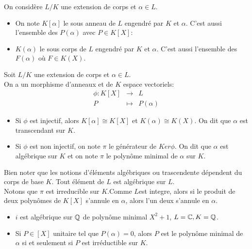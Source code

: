 \begin{definition}
	On considère $L/K$ une extension de corps et $\alpha \in L$. \\
	\begin{itemize}
		\item On note $K[\alpha]$ le sous anneau de $L$ engendré par $K$ et $\alpha$. C'est aussi l'ensemble des $P(\alpha)$ avec $P \in K[X]$:
		\item $K(\alpha)$ le sous corps de $L$ engendré par $K$ et $\alpha$. C'est aussi l'ensemble des $F(\alpha)$ où $F \in K(X)$.
	\end{itemize}
\end{definition}


\begin{definition}
	Soit $L/K$ une extension de corps et $\alpha \in L$.\\
	On a un morphisme d'anneaux et de $K$ espace vectoriels:
	\begin{eqnarray*}
		\phi: K[X] &\to& L \\
		P &\mapsto& P(\alpha)
	\end{eqnarray*}
	\begin{itemize}
		\item Si $\phi$ est injectif, alors $K[\alpha] \cong K[X]$ et $K(\alpha) \cong K(X)$. On dit que $\alpha$ est transcendant sur $K$.
		\item Si $\phi$ est non injectif, on note $\pi$ le générateur de $Ker \phi$. On dit que $\alpha$ est algébrique sur $K$ et on note $\pi$ le polynôme minimal de
		      $\alpha$ sur $K$. %
	\end{itemize}
\end{definition}

\begin{remarque}
	Bien noter que les notions d'éléments algébriques ou trascendente dépendent du corps de base $K$. Tout élément de $L$ est algébrique sur $L$.\\
	Notons que $\pi$ est irreducible sur $K$.Comme $L$est integre, alors si le produit de deux polynômes de $K[X]$ s'annule en $\alpha$, alors l'un deux s'annule en $\alpha$.
\end{remarque}

\begin{example}
	\begin{itemize}
		\item $i$ est algébrique sur $\mathbb{Q}$ de polynôme minimal $X^2+1$, $L = \mathbb{C}, K = \mathbb{Q}$.
		\item Si $P \in [X]$ unitaire tel que $P(\alpha) = 0$, alors $P$ est le polynôme minimal de $\alpha$ si et seulement si $P$ est irréductible sur $K$.
	\end{itemize}
\end{example}

